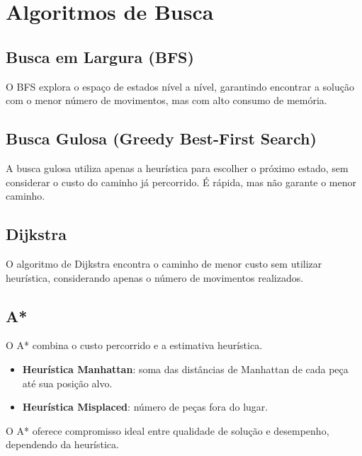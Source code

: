 \documentclass[12pt]{article}
\begin{document}
\section{Algoritmos de Busca}
\subsection{Busca em Largura (BFS)}
O BFS explora o espaço de estados nível a nível, garantindo encontrar a solução com o menor número de movimentos, mas com alto consumo de memória.

\subsection{Busca Gulosa (Greedy Best-First Search)}
A busca gulosa utiliza apenas a heurística para escolher o próximo estado, sem considerar o custo do caminho já percorrido. É rápida, mas não garante o menor caminho.

\subsection{Dijkstra}
O algoritmo de Dijkstra encontra o caminho de menor custo sem utilizar heurística, considerando apenas o número de movimentos realizados.

\subsection{A*}
O A* combina o custo percorrido e a estimativa heurística.
\begin{itemize}
  \item \textbf{Heurística Manhattan}: soma das distâncias de Manhattan de cada peça até sua posição alvo.
  \item \textbf{Heurística Misplaced}: número de peças fora do lugar.
\end{itemize}
O A* oferece compromisso ideal entre qualidade de solução e desempenho, dependendo da heurística.
\end{document}
